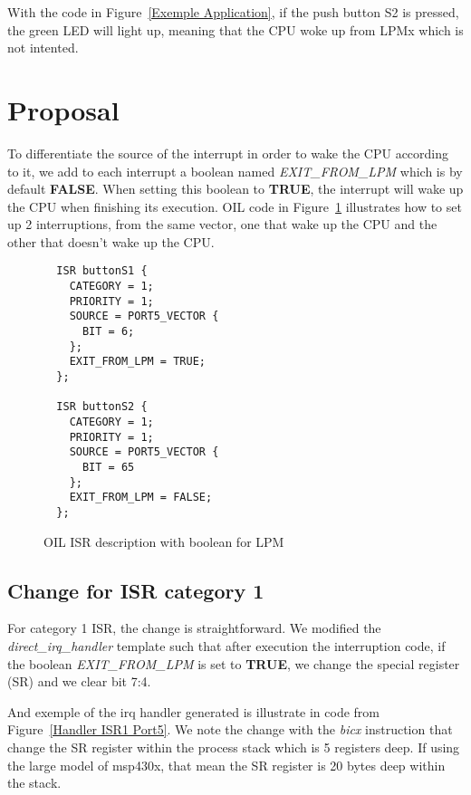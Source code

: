 \documentclass[11pt, oneside]{article}
\begin{document}
With the code in Figure~\ref{Exemple Application}, if the push button S2 is pressed, the green LED will light up, meaning that the CPU woke up from LPMx which is not intented.

\section{Proposal}
To differentiate the source of the interrupt in order to wake the CPU according to it, we add to each interrupt a boolean named \emph{EXIT\_FROM\_LPM} which is by default \textbf{FALSE}. When setting this boolean to \textbf{TRUE}, the interrupt will wake up the CPU when finishing its execution. 
OIL code in Figure~\ref{Exemple OIL} illustrates how to set up 2 interruptions, from the same vector, one that wake up the CPU and the other that doesn't wake up the CPU.

\begin{figure}
\caption{OIL ISR description with boolean for LPM}
\begin{lstlisting}
  ISR buttonS1 {
    CATEGORY = 1;
    PRIORITY = 1;
    SOURCE = PORT5_VECTOR {
      BIT = 6;
    };    
    EXIT_FROM_LPM = TRUE;
  };
  
  ISR buttonS2 {
    CATEGORY = 1;
    PRIORITY = 1;
    SOURCE = PORT5_VECTOR {
      BIT = 65
    };    
    EXIT_FROM_LPM = FALSE;
  };

\end{lstlisting}
\label{Exemple OIL}
\end{figure}

\subsection{Change for ISR category 1}

For category 1 ISR, the change is straightforward. We modified the \emph{direct\_irq\_handler} template such that after execution the interruption code, if the boolean \emph{EXIT\_FROM\_LPM} is set to \textbf{TRUE}, we change the special register (SR) and we clear bit 7:4.

And exemple of the irq handler generated is illustrate in code from Figure~\ref{Handler ISR1 Port5}. We note the change with the \emph{bicx} instruction that change the SR register within the process stack which is 5 registers deep. If using the large model of msp430x, that mean the SR register is 20 bytes deep within the stack.
\end{document}
